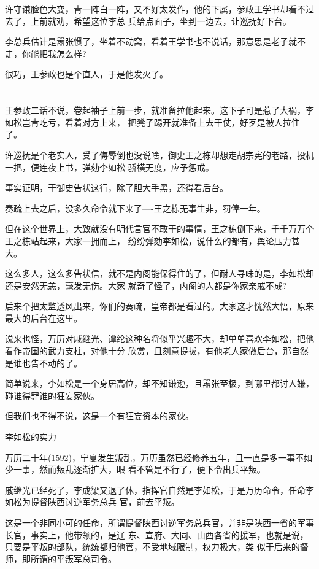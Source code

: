 \documentclass[11pt,a4paper,onecolumn]{article}
\begin{document}
许守谦脸色大变，青一阵白一阵，又不好太发作，他的下属，参政王学书却看不过去了，上前就劝，希望这位李总
兵给点面子，坐到一边去，让巡抚好下台。

李总兵估计是嚣张惯了，坐着不动窝，看着王学书也不说话，那意思是老子就不走，你能把我怎么样?

很巧，王参政也是个直人，于是他发火了。

\section[\thesection]{}

王参政二话不说，卷起袖子上前一步，就准备拉他起来。这下子可是惹了大祸，李如松岂肯吃亏，看着对方上来，
把凳子踢开就准备上去干仗，好歹是被人拉住了。

许巡抚是个老实人，受了侮辱倒也没说啥，御史王之栋却想走胡宗宪的老路，投机一把，便连夜上书，弹劾李如松
骄横无度，应予惩戒。

事实证明，干御史告状这行，除了胆大手黑，还得看后台。

奏疏上去之后，没多久命令就下来了----王之栋无事生非，罚俸一年。

但在这个世界上，大致就没有明代言官不敢干的事情，王之栋倒下来，千千万万个王之栋站起来，大家一拥而上，
纷纷弹劾李如松，说什么的都有，舆论压力甚大。

这么多人，这么多告状信，就不是内阁能保得住的了，但耐人寻味的是，李如松却还是安然无恙，毫发无伤。大家
就奇了怪了，内阁的人都是你家亲戚不成?

后来个把太监透风出来，你们的奏疏，皇帝都是看过的。大家这才恍然大悟，原来最大的后台在这里。

说来也怪，万历对戚继光、谭纶这种名将似乎兴趣不大，却单单喜欢李如松，把他看作帝国的武力支柱，对他十分
欣赏，且刻意提拔，有他老人家做后台，那自然是谁也告不动的了。

简单说来，李如松是一个身居高位，却不知谦逊，且嚣张至极，到哪里都讨人嫌，碰谁得罪谁的狂妄家伙。

但我们也不得不说，这是一个有狂妄资本的家伙。

李如松的实力

万历二十年(1592)，宁夏发生叛乱，万历虽然已经修养五年，且一直是多一事不如少一事，然而叛乱逐渐扩大，眼
看不管是不行了，便下令出兵平叛。

戚继光已经死了，李成梁又退了休，指挥官自然是李如松，于是万历命令，任命李如松为提督陕西讨逆军务总兵
官，前去平叛。

这是一个非同小可的任命，所谓提督陕西讨逆军务总兵官，并非是陕西一省的军事长官，事实上，他带领的，是辽
东、宣府、大同、山西各省的援军，也就是说，只要是平叛的部队，统统都归他管，不受地域限制，权力极大，类
似于后来的督师，即所谓的平叛军总司令。
\end{document}
